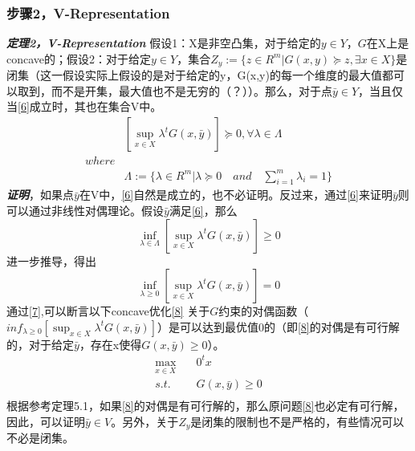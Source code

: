 \documentclass[UTF8,a4]{article}
\begin{document}
\subsubsection{步骤2，V-Representation}
\textbf{\emph{定理2，V-Representation}}
假设1：X是非空凸集，对于给定的$y\in Y$，$G$在X上是concave的；假设2：对于给定$y\in Y$，集合$Z_y:=\{z\in R^m|G(x,y)\succeq z, \exists x\in X\}$是闭集（这一假设实际上假设的是对于给定的y，G(x,y)的每一个维度的最大值都可以取到，而不是开集，最大值也不是无穷的（？））。那么，对于点$\bar{y}\in Y$，当且仅当\eqref{6}成立时，其也在集合V中。
\begin{equation}
\label{6}
\begin{split}
&[\sup_{x\in X}\lambda^tG(x,\bar{y})]\succeq 0,\forall\lambda\in\Lambda\\
where\\
&\Lambda:=\{\lambda\in R^m|\lambda\succeq 0\quad and \quad \sum_{i=1}^m\lambda_i=1\}
\end{split}
\end{equation}
\textbf{\emph{证明}}，如果点$\bar{y}$在V中，\eqref{6}自然是成立的，也不必证明。反过来，通过\eqref{6}来证明$\bar{y}$则可以通过非线性对偶理论。假设$\bar{y}$满足\eqref{6}，那么
$$
\inf_{\lambda\in\Lambda}[\sup_{x \in X} \lambda^t G(x,\bar{y})]\geqslant0
$$
进一步推导，得出
\begin{equation}
\label{7}
\inf_{\lambda\geqslant0}[\sup_{x\in X}\lambda^tG(x,\bar{y})]=0
\end{equation}
通过\eqref{7},可以断言以下concave优化\eqref{8} 关于$G$约束的对偶函数（$inf_{\lambda\geqslant0}[\sup_{x\in X}\lambda^tG(x,\bar{y})]$）是可以达到最优值0的（即\eqref{8}的对偶是有可行解的，对于给定$\bar{y}$，存在x使得$G(x,\bar{y})\geqslant 0$）。
\begin{equation}
\label{8}
\begin{split}
\max_{x\in X}&\quad 0^t x\\
s.t.&\quad G(x,\bar{y})\geqslant0\\
\end{split}
\end{equation}
根据参考定理5.1，如果\eqref{8}的对偶是有可行解的，那么原问题\eqref{8}也必定有可行解，因此，可以证明$\bar{y}\in V$。另外，关于$Z_y$是闭集的限制也不是严格的，有些情况可以不必是闭集。
\end{document}
